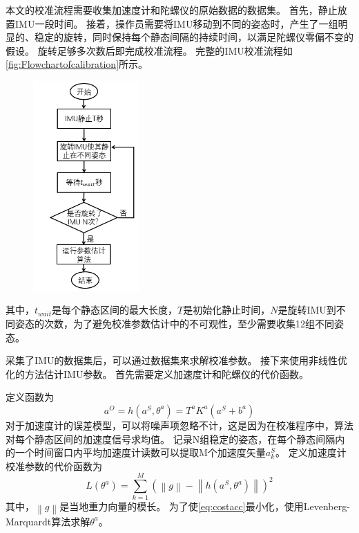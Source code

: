 \documentclass[
  type=master
]{gdutthesis}
\begin{document}
本文的校准流程需要收集加速度计和陀螺仪的原始数据的数据集。
首先，静止放置IMU一段时间。
接着，操作员需要将IMU移动到不同的姿态时，产生了一组明显的、稳定的旋转，同时保持每个静态间隔的持续时间，以满足陀螺仪零偏不变的假设。
旋转足够多次数后即完成校准流程。
完整的IMU校准流程如\autoref{fig:Flowchartofcalibration}所示。
\begin{figure}[H]
	\centering
	\includegraphics[width=0.36\textwidth]{屏幕截图 2022-05-07 001106.png}
	\label{fig:Flowchartofcalibration}
\end{figure}
其中，$t_{wait}$是每个静态区间的最大长度，$T$是初始化静止时间，$N$是旋转IMU到不同姿态的次数，为了避免校准参数估计中的不可观性，至少需要收集12组不同姿态。

采集了IMU的数据集后，可以通过数据集来求解校准参数。
接下来使用非线性优化的方法估计IMU参数。
首先需要定义加速度计和陀螺仪的代价函数。

定义函数为
\begin{equation}
	a^O=h(a^S,\theta^a) =T^a K^a (a^S + b^a)
\end{equation}
对于加速度计的误差模型，可以将噪声项忽略不计，这是因为在校准程序中，算法对每个静态区间的加速度信号求均值。
记录N组稳定的姿态，在每个静态间隔内的一个时间窗口内平均加速度计读数可以提取M个加速度矢量$a^S_k$。
定义加速度计校准参数的代价函数为
\begin{equation}\label{eq:costacc}
	L(\theta^a)=\sum_{k=1}^{M}(\left\|g\right\|-\left\|h(a^S,\theta^a)\right\|)^2
\end{equation}
其中，$\left\|g\right\|$是当地重力向量的模长。
为了使\autoref{eq:costacc}最小化，使用Levenberg-Marquardt算法求解$\theta^a$。
\end{document}
